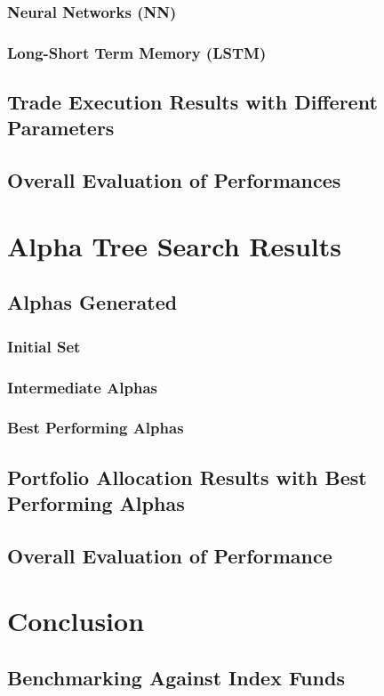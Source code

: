 \documentclass[a4paper,12pt]{report}
\numberwithin{equation}{section}
\theoremstyle{definition}
\begin{document}
\subsection{Neural Networks (NN)}
\subsection{Long-Short Term Memory (LSTM)}
\section{Trade Execution Results with Different Parameters}
\section{Overall Evaluation of Performances}


\chapter{Alpha Tree Search Results}
\section{Alphas Generated}
\subsection{Initial Set}
\subsection{Intermediate Alphas}
\subsection{Best Performing Alphas}
\section{Portfolio Allocation Results with Best Performing Alphas}
\section{Overall Evaluation of Performance}



\chapter{Conclusion}
\section{Benchmarking Against Index Funds}
\end{document}
